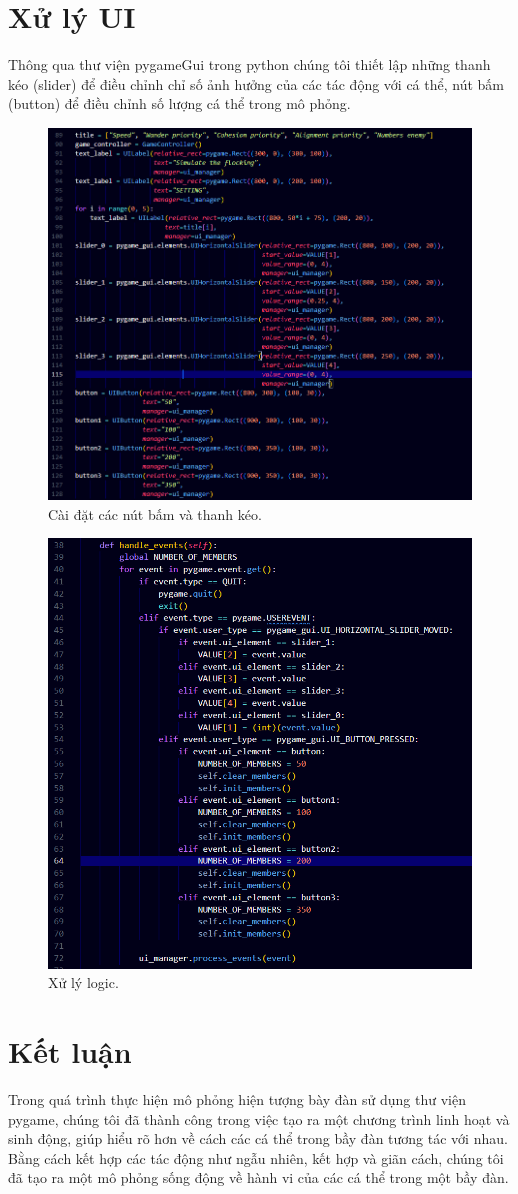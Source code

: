 \documentclass{article}
\begin{document}
\section{Xử lý UI}
Thông qua thư viện pygameGui trong python chúng tôi thiết lập những thanh kéo (slider) để điều chỉnh chỉ số ảnh hưởng của các tác động với cá thể, nút bấm (button) để điều chỉnh số lượng cá thể trong mô phỏng.
\begin{figure}[htbp]
  \centering
  \includegraphics[width=0.5\linewidth]{UI1.png} 
  \caption{Cài đặt các nút bấm và thanh kéo.}
\end{figure}
\begin{figure}[htbp]
  \centering
  \includegraphics[width=0.5\linewidth]{UI2.png} 
  \caption{Xử lý logic.}
\end{figure}

\section{Kết luận}

Trong quá trình thực hiện mô phỏng hiện tượng bày đàn sử dụng thư viện pygame, chúng tôi đã thành công trong việc tạo ra một chương trình linh hoạt và sinh động, giúp hiểu rõ hơn về cách các cá thể trong bầy đàn tương tác với nhau. Bằng cách kết hợp các tác động như ngẫu nhiên, kết hợp và giãn cách, chúng tôi đã tạo ra một mô phỏng sống động về hành vi của các cá thể trong một bầy đàn.
\end{document}
